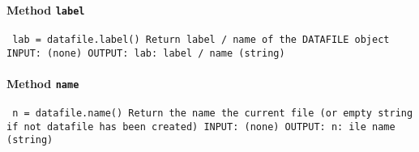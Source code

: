 \paragraph{Method \texttt{label}}
\vspace{1ex}
\texttt{\newline
lab = datafile.label()\newline
\newline
Return label / name of the DATAFILE object\newline
\newline
INPUT:\newline
(none)\newline
\newline
OUTPUT:\newline
lab: label / name (string)\newline
\newline
}

\paragraph{Method \texttt{name}}
\vspace{1ex}
\texttt{\newline
n = datafile.name()\newline
\newline
Return the name the current file (or empty string if not datafile has been created)\newline
\newline
INPUT:\newline
(none)\newline
\newline
OUTPUT:\newline
n: ile name (string)\newline
\newline
}

